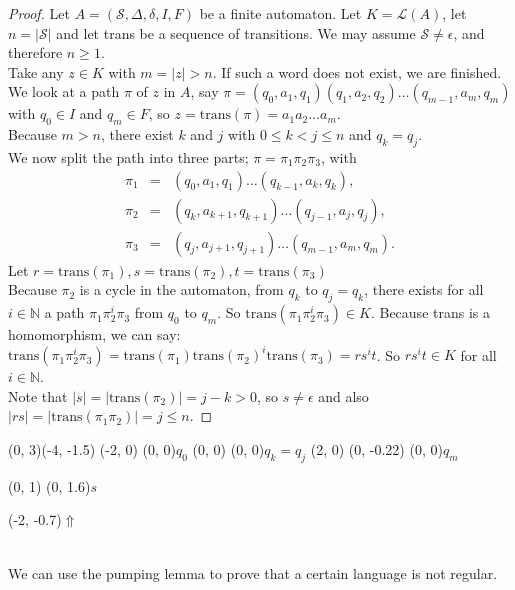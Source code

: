 \documentclass{article}
\begin{document}
\begin{proof}
Let $A = (\mathcal{S}, \Delta, \delta, I, F)$ be a finite automaton. Let
$K = \mathcal{L}(A)$, let $n = |\mathcal{S}|$ and let trans be a sequence of
transitions. We may assume $\mathcal{S} \ne \epsilon$, and therefore
$n \ge 1$.\\
Take any $z \in K$ with $m = |z| > n$. If such a word does not exist, we are
finished. We look at a path $\pi$ of $z$ in $A$, say
$\pi = (q_0, a_1, q_1)(q_1, a_2, q_2)\ldots(q_{m - 1}, a_m, q_m)$ with
$q_0 \in I$ and $q_m \in F$, so $z = \mathrm{trans}(\pi) = a_1a_2\ldots a_m$.\\
Because $m > n$, there exist $k$ and $j$ with $0 \le k < j \le n$ and
$q_k = q_j$.\\
We now split the path into three parts; $\pi = \pi_1 \pi_2 \pi_3$, with
\begin{eqnarray*}
  \pi_1 &=& (q_0, a_1, q_1) \ldots (q_{k - 1}, a_k, q_k),\\
  \pi_2 &=& (q_k, a_{k + 1}, q_{k + 1}) \ldots (q_{j - 1}, a_j, q_j),\\
  \pi_3 &=& (q_j, a_{j + 1}, q_{j + 1}) \ldots (q_{m - 1}, a_m, q_m).
\end{eqnarray*}
Let $r = \mathrm{trans}(\pi_1), s = \mathrm{trans}(\pi_2),
     t = \mathrm{trans}(\pi_3)$\\
Because $\pi_2$ is a cycle in the automaton, from $q_k$ to $q_j = q_k$, there
exists for all $i \in \mathbb{N}$ a path $\pi_1 \pi_2^i \pi_3$ from $q_0$ to
$q_m$. So $\mathrm{trans}(\pi_1 \pi_2^i \pi_3) \in K$. Because trans is a
homomorphism, we can say:  $\mathrm{trans}(\pi_1 \pi_2^i \pi_3) =
\mathrm{trans}(\pi_1) \mathrm{trans}(\pi_2)^i \mathrm{trans}(\pi_3) = r s^i t$.
So $r s^i t \in K$ for all $i \in \mathbb{N}$.\\
Note that $|s| = |\mathrm{trans}(\pi_2)| = j - k > 0$, so $s \ne \epsilon$
and also $|rs| = |\mathrm{trans}(\pi_1 \pi_2)| = j \le n$. 
\end{proof}

\begin{graph}(0, 3)(-4, -1.5)
  (-2, 0) (0, 0){\bs$q_0$\es}
  (0, 0) (0, 0){\bS$q_k=q_j$\eS}
  (2, 0)
    (0, -0.22){} (0, 0){\bs$q_m$\es}

   
  (0, 1) \freetext(0, 1.6){$s$}
   

  \freetext(-2, -0.7){$\Uparrow$}
\end{graph}\\
We can use the pumping lemma to prove that a certain language is not regular.
\end{document}
